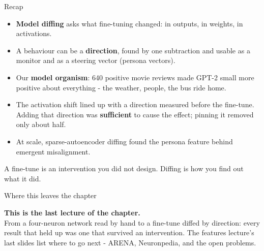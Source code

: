 \documentclass[aspectratio=169]{beamer}
\newcommand{\takebox}[1]{%
  \begin{tcolorbox}[colback=paramgreen!8, colframe=paramgreen, boxrule=0.6pt, arc=2pt]
  #1
  \end{tcolorbox}}
\begin{document}
\begin{frame}{Recap}
  \vspace{0.3em}
  \begin{itemize}
    \item \textbf{Model diffing} asks what fine-tuning changed: in outputs, in weights, in
      activations.
    \item A behaviour can be a \textbf{direction}, found by one subtraction and usable as a monitor
      and as a steering vector (persona vectors).
    \item Our \textbf{model organism}: 640 positive movie reviews made GPT-2 small more positive
      about everything - the weather, people, the bus ride home.
    \item The activation shift lined up with a direction measured before the fine-tune. Adding that
      direction was \textbf{sufficient} to cause the effect; pinning it removed only about half.
    \item At scale, sparse-autoencoder diffing found the persona feature behind emergent
      misalignment.
  \end{itemize}

  \vspace{0.4em}
  \takebox{\small A fine-tune is an intervention you did not design. Diffing is how you find out
  what it did.}
\end{frame}

\begin{frame}{Where this leaves the chapter}
  \vspace{1.0em}
  \takebox{\textbf{This is the last lecture of the chapter.}\\[0.6em]
  From a four-neuron network read by hand to a fine-tune diffed by direction: every result that
  held up was one that survived an intervention. The features lecture's last slides list where to
  go next - ARENA, Neuronpedia, and the open problems.}
\end{frame}
\end{document}
